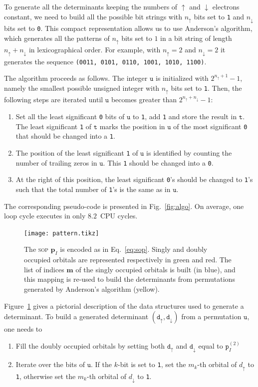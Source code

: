 \documentclass[aip,jcp,reprint,showkeys]{revtex4-1}
\newcommand{\tu}{\mathtt{u}}
\newcommand{\ttt}{\mathtt{t}}
\newcommand{\md}{\mathtt{d}}
\newcommand{\mpp}{\mathtt{p}}
\newcommand{\mpv}{\mathbf{p}}
\newcommand{\up}{\uparrow}
\newcommand{\dn}{\downarrow}
\newcommand{\one}{{\texttt{1}}}
\newcommand{\zero}{{\texttt{0}}}
\newcommand{\sop}{\textsc{sop}}
\begin{document}
To generate all the determinants keeping the numbers of $\up$ and $\dn$
electrons constant, we need to build all the possible bit strings with $n_\up$
bits set to \one{} and $n_\dn$ bits set to \zero{}.
This compact representation allows us to use Anderson's algorithm,\cite{NextBit}
which generates all
the patterns of $n_\up$ bits set to $1$ in a bit string of length $n_\up+n_\dn$
in lexicographical order. For example, with $n_\up=2$ and $n_\dn=2$
it generates the sequence \texttt{(0011, 0101, 0110, 1001, 1010, 1100)}.

The algorithm proceeds as follows. The integer $\tu$ is initialized with
$2^{n_\up+1}-1$, namely the smallest possible unsigned integer with $n_\up$
bits set to \one. 
Then, the following steps are iterated until $\tu$ becomes
greater than $2^{n_\up+n_\dn}-1$:
\begin{enumerate}
    \item Set all the least significant \zero{} bits of $\tu$ to \one{}, add \one{} and store the result in $\ttt$. The least significant \one{} of $\ttt$ marks the position in $\tu$ of the most significant \zero{} that should be changed into a \one{}.
    \item The position of the least significant \one{} of $\tu$ is identified by counting the number of trailing zeros in $\tu$. This \one{} should be changed into a \zero{}.
    \item At the right of this position, the least significant \zero's should be changed to \one's such that the total number of \one's is the same as in $\tu$.
\end{enumerate}
The corresponding pseudo-code is presented in Fig.~\ref{fig:algo}. On average, one loop cycle executes in only $8.2$~CPU cycles.

\begin{figure}[t]
\texttt{[image: pattern.tikz]} 
\caption{The {\sop} $\mpv_I$ is encoded as in Eq.~\eqref{eq:sop}. Singly and doubly
occupied orbitals are represented respectively in green and red.
The list of indices $\mathbf{m}$ of the singly occupied orbitals is built (in blue), and this
mapping is re-used to build the determinants from permutations generated by Anderson's algorithm (yellow).}
\label{fig:mapping}
\end{figure}

Figure~\ref{fig:mapping} gives a pictorial description of the data structures used to generate a determinant.
To build a generated determinant $(\md_\up,\md_\dn)$ from a permutation $\tu$, one needs to
\begin{enumerate}
    \item Fill the doubly occupied orbitals by setting both $\md_\up$ and $\md_\dn$
          equal to $\mpp_I^{(2)}$
    \item Iterate over the bits of $\tu$. If the $k$-bit is set to \one{}, set the $m_k$-th orbital of $d_\up$ to \one, otherwise set the $m_k$-th orbital of $d_\dn$ to \one.
\end{enumerate}
\end{document}
